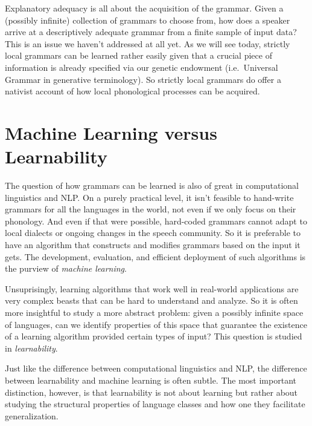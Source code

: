 Explanatory adequacy is all about the acquisition of the grammar.
Given a (possibly infinite) collection of grammars to choose from, how does a speaker arrive at a descriptively adequate grammar from a finite sample of input data?
This is an issue we haven't addressed at all yet. 
As we will see today, strictly local grammars can be learned rather easily given that a crucial piece of information is already specified via our genetic endowment (i.e.\ Universal Grammar in generative terminology).
So strictly local grammars do offer a nativist account of how local phonological processes can be acquired.

\section{Machine Learning versus Learnability}

The question of how grammars can be learned is also of great in computational linguistics and NLP\@.
On a purely practical level, it isn't feasible to hand-write grammars for all the languages in the world, not even if we only focus on their phonology.
And even if that were possible, hard-coded grammars cannot adapt to local dialects or ongoing changes in the speech community.
So it is preferable to have an algorithm that constructs and modifies grammars based on the input it gets.
The development, evaluation, and efficient deployment of such algorithms is the purview of \emph{machine learning}.

Unsuprisingly, learning algorithms that work well in real-world applications are very complex beasts that can be hard to understand and analyze.
So it is often more insightful to study a more abstract problem: given a possibly infinite space of languages, can we identify properties of this space that guarantee the existence of a learning algorithm provided certain types of input?
This question is studied in \emph{learnability}.

Just like the difference between computational linguistics and NLP, the difference between learnability and machine learning is often subtle.
The most important distinction, however, is that learnability is not about learning but rather about studying the structural properties of language classes and how one they facilitate generalization.

